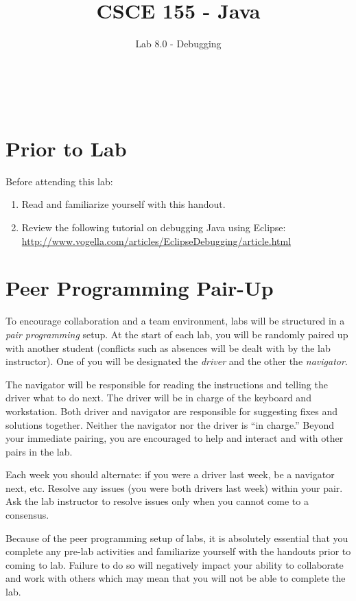 \documentclass[12pt]{scrartcl}
\title{CSCE 155 - Java}
\subtitle{Lab 8.0 - Debugging}
\author{~}
\date{~}
\begin{document}
\maketitle

\section*{Prior to Lab}

Before attending this lab:
\begin{enumerate}
  \item Read and familiarize yourself with this handout.
  \item Review the following tutorial on debugging Java using Eclipse:\\
	\url{http://www.vogella.com/articles/EclipseDebugging/article.html}
\end{enumerate}

\section*{Peer Programming Pair-Up}

To encourage collaboration and a team environment, labs will be
structured in a \emph{pair programming} setup.  At the start of
each lab, you will be randomly paired up with another student 
(conflicts such as absences will be dealt with by the lab instructor).
One of you will be designated the \emph{driver} and the other
the \emph{navigator}.  

The navigator will be responsible for reading the instructions and
telling the driver what to do next.  The driver will be in charge of the
keyboard and workstation.  Both driver and navigator are responsible
for suggesting fixes and solutions together.  Neither the navigator
nor the driver is ``in charge.''  Beyond your immediate pairing, you
are encouraged to help and interact and with other pairs in the lab.

Each week you should alternate: if you were a driver last week, 
be a navigator next, etc.  Resolve any issues (you were both drivers
last week) within your pair.  Ask the lab instructor to resolve issues
only when you cannot come to a consensus.  

Because of the peer programming setup of labs, it is absolutely 
essential that you complete any pre-lab activities and familiarize
yourself with the handouts prior to coming to lab.  Failure to do
so will negatively impact your ability to collaborate and work with 
others which may mean that you will not be able to complete the
lab.  
\end{document}
